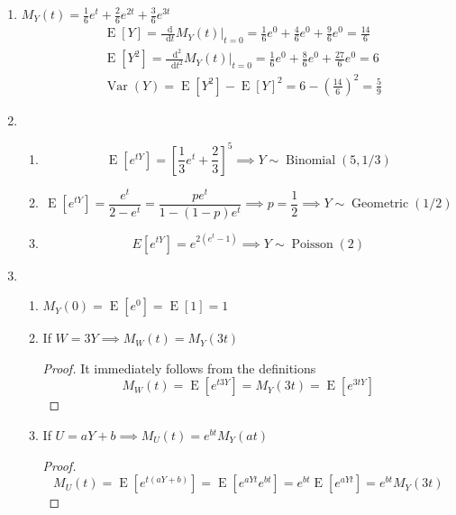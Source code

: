 \documentclass{article}
\newcommand{\var}[1]{\operatorname{Var}(#1)}
\newcommand{\expt}[1]{\operatorname{E}[#1]}
\newcommand{\binomdist}[3]{#1 \sim \operatorname{Binomial}(#2, #3)}
\newcommand{\geodist}[2]{#1 \sim \operatorname{Geometric}(#2)}
\newcommand{\poisson}[2]{#1 \sim \operatorname{Poisson}(#2)}
\newcommand*\diff{\mathop{}\!\mathrm{d}}
\newcommand{\drv}[3]{\frac{\diff#1^{#3}}{\diff#2^{#3}}}
\begin{document}
\begin{enumerate}
  \item $M_Y(t) = \frac{1}{6}e^t + \frac{2}{6}e^{2t} + \frac{3}{6}e^{3t}$
  \begin{align*}
    &\expt{Y} = \drv{}{t}{}M_Y(t)\bigg\rvert_{t=0} = 
    \frac{1}{6}e^0 + \frac{4}{6}e^{0} + \frac{9}{6}e^{0} = \frac{14}{6}\\
    &\expt{Y^2} = \drv{}{t}{2}M_Y(t)\bigg\rvert_{t=0} = \frac{1}{6}e^0 + \frac{8}{6}e^{0} + \frac{27}{6}e^{0} = 6\\
    &\var{Y} = \expt{Y^2} - \expt{Y}^2 = 6 - \left( \frac{14}{6} \right)^2 = \frac{5}{9}
  \end{align*}

  \item \begin{enumerate}
    \item \[
      \expt{e^{tY}} = \left[\frac{1}{3}e^t +\frac{2}{3}\right]^5 \implies \binomdist{Y}{5}{1/3}
    \]
    \item \[
      \expt{e^{tY}} = \frac{e^t}{2-e^t} = \frac{pe^t}{1-(1-p)e^t} \implies p = \frac{1}{2} \implies \geodist{Y}{1/2}
    \]
    \item \[
      E[e^{tY}] = e^{2(e^t-1)} \implies \poisson{Y}{2}
    \]
  \end{enumerate}

  \item \begin{enumerate}
    \item $M_Y(0) = \expt{e^0} = \expt{1} = 1$
    \item If $W = 3Y \implies M_W(t) = M_Y(3t)$
    \begin{proof}
      It immediately follows from the definitions
      \[
        M_W(t) = \expt{e^{t3Y}} = M_Y(3t) = \expt{e^{3tY}}
      \]
    \end{proof}
    \item If $U = aY+b \implies M_U(t) = e^{bt}M_Y(at)$
    \begin{proof}
      \[
        M_U(t) = \expt{e^{t(aY+b)}} = \expt{e^{aYt}e^{bt}} = e^{bt}\expt{e^{aYt}} = e^{bt}M_Y(3t)
      \]
    \end{proof}
  \end{enumerate}


\end{enumerate}
\end{document}
